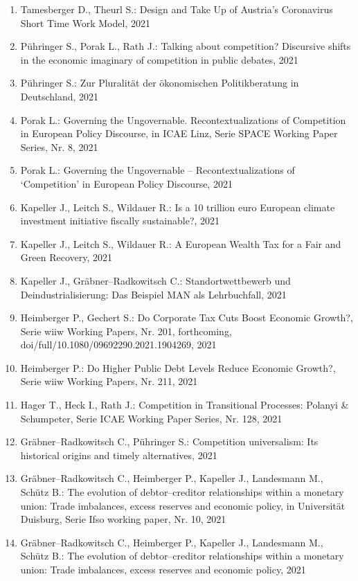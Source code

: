 \begin{enumerate}
    	 \item Tamesberger D., Theurl S.: Design and Take Up of Austria’s Coronavirus Short Time Work Model, 2021
	 \item Pühringer S., Porak L., Rath J.: Talking about competition? Discursive shifts in the economic imaginary of competition in public debates, 2021
	 \item Pühringer S.: Zur Pluralität der ökonomischen Politikberatung in Deutschland, 2021
	 \item Porak L.: Governing the Ungovernable. Recontextualizations of Competition in European Policy Discourse, in ICAE Linz, Serie SPACE Working Paper Series, Nr. 8, 2021
	 \item Porak L.: Governing the Ungovernable -- Recontextualizations of ‘Competition’ in European Policy Discourse, 2021
	 \item Kapeller J., Leitch S., Wildauer R.: Is a 10 trillion euro European climate investment initiative fiscally sustainable?, 2021
	 \item Kapeller J., Leitch S., Wildauer R.: A European Wealth Tax for a Fair and Green Recovery, 2021
	 \item Kapeller J., Gräbner--Radkowitsch C.: Standortwettbewerb und Deindustrialisierung: Das Beispiel MAN als Lehrbuchfall, 2021
	 \item Heimberger P., Gechert S.: Do Corporate Tax Cuts Boost Economic Growth?, Serie wiiw Working Papers, Nr. 201, forthcoming, doi/full/10.1080/09692290.2021.1904269, 2021
	 \item Heimberger P.: Do Higher Public Debt Levels Reduce Economic Growth?, Serie wiiw Working Papers, Nr. 211, 2021
	 \item Hager T., Heck I., Rath J.: Competition in Transitional Processes: Polanyi \& Schumpeter, Serie ICAE Working Paper Series, Nr. 128, 2021
	 \item Gräbner--Radkowitsch C., Pühringer S.: Competition universalism: Its historical origins and timely alternatives, 2021
	 \item Gräbner--Radkowitsch C., Heimberger P., Kapeller J., Landesmann M., Schütz B.: The evolution of debtor--creditor relationships within a monetary union: Trade imbalances, excess reserves and economic policy, in Universität Duisburg, Serie Ifso working paper, Nr. 10, 2021
	 \item Gräbner--Radkowitsch C., Heimberger P., Kapeller J., Landesmann M., Schütz B.: The evolution of debtor--creditor relationships within a monetary union: Trade imbalances, excess reserves and economic policy, 2021

\end{enumerate}
